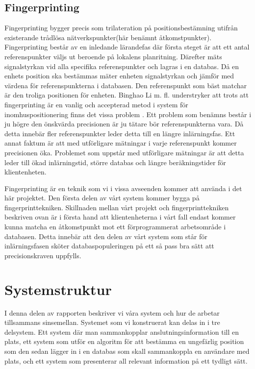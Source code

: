 \documentclass[swedish, a4paper,12pt]{article}
\begin{document}
\subsection{Fingerprinting}
Fingerprinting bygger precis som trilateration på positionsbestämning utifrån existerande trådlösa nätverkspunkter(här benämnt åtkomstpunkter). Fingerprinting består av en inledande lärandefas där första steget är att ett antal referenspunkter väljs ut beroende på lokalens planritning. Därefter mäts signalstyrkan vid alla specifika referenspunkter och lagras i en databas.%
Då en enhets position ska bestämmas mäter enheten signalstyrkan och jämför med värdena för referenspunkterna i databasen. Den referenspunkt som bäst matchar är den troliga positionen för enheten.\cite{IP1}\cite{jun2018low}
Binghao Li m. fl. understryker att trots att fingerprinting är en vanlig och accepterad metod i system för inomhuspositionering finns det vissa problem .\cite{IP1}
Ett problem som benämns består i ju högre den önskvärda precisionen är ju tätare bör referenspunkterna vara. Då detta innebär fler referenspunkter leder detta till en längre inlärningsfas. Ett annat faktum är att med utförligare mätningar i varje referenspunkt kommer precisionen öka. Problemet som uppstår med utförligare mätningar är att detta leder till ökad inlärningstid, större databas och längre beräkningstider för klientenheten.\cite{IP1}

Fingerprinting är en teknik som vi i vissa avseenden kommer att använda i det här projektet. Den första delen av vårt system kommer bygga på fingerprinttekniken. Skillnaden mellan vårt projekt och fingerprinttekniken beskriven ovan är i första hand att klientenheterna i vårt fall endast kommer kunna matcha en åtkomstpunkt mot ett förprogrammerat arbetsområde i databasen. Detta innebär att den delen av vårt system som står för inlärningsfasen sköter databaspopuleringen på ett så pass bra sätt att precisionskraven uppfylls.
\fi
\section{Systemstruktur}
I denna delen av rapporten beskriver vi våra system och hur de arbetar tillsammans sinsemellan.
Systemet som vi konstruerat kan delas in i tre delsystem. Ett system där man sammankopplar anslutningsinformation till en plats, ett system som utför en algoritm för att bestämma en ungefärlig position som den sedan lägger in i en databas som skall sammankoppla en användare med plats, och ett system som presenterar all relevant information på ett tydligt sätt.
\end{document}
